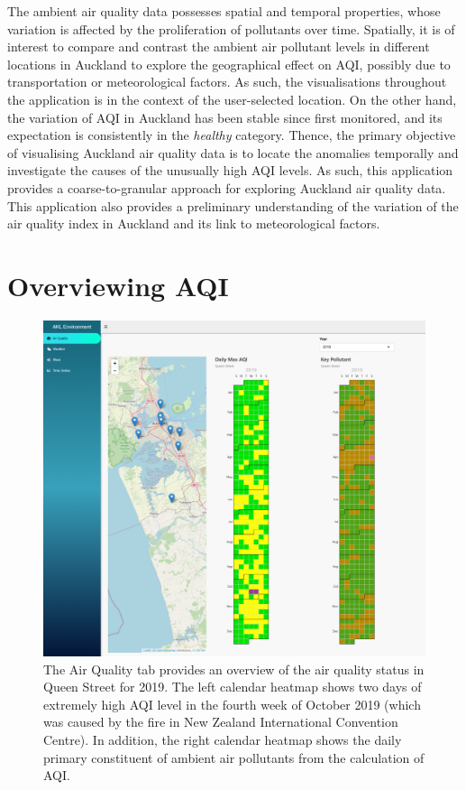 \documentclass{aucklandthesis}
\begin{document}
The ambient air quality data possesses spatial and temporal properties, whose variation is affected by the proliferation of pollutants over time. Spatially, it is of interest to compare and contrast the ambient air pollutant levels in different locations in Auckland to explore the geographical effect on AQI, possibly due to transportation or meteorological factors. As such, the visualisations throughout the application is in the context of the user-selected location. On the other hand, the variation of AQI in Auckland has been stable since first monitored, and its expectation is consistently in the \emph{healthy} category. Thence, the primary objective of visualising Auckland air quality data is to locate the anomalies temporally and investigate the causes of the unusually high AQI levels. As such, this application provides a coarse-to-granular approach for exploring Auckland air quality data. This application also provides a preliminary understanding of the variation of the air quality index in Auckland and its link to meteorological factors.

\hypertarget{overviewing-aqi}{%
\section{Overviewing AQI}\label{overviewing-aqi}}

\begin{figure}
\includegraphics[width=1\linewidth]{figures/aqi-tab} \caption{The Air Quality tab provides an overview of the air quality status in Queen Street for 2019. The left calendar heatmap shows two days of extremely high AQI level in the fourth week of October 2019 (which was caused by the fire in New Zealand International Convention Centre). In addition, the right calendar heatmap shows the daily primary constituent of ambient air pollutants from the calculation of AQI.}\label{fig:unnamed-chunk-2}
\end{figure}
\end{document}
